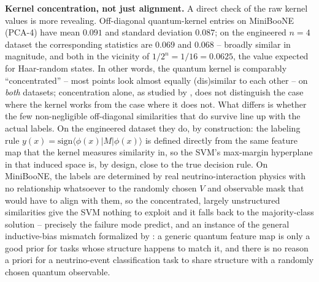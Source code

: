 \documentclass{article}
\begin{document}
\textbf{Kernel concentration, not just alignment.} A direct check of the raw
kernel values is more revealing. Off-diagonal quantum-kernel entries on
MiniBooNE (PCA-4) have mean $0.091$ and standard deviation $0.087$; on the
engineered $n{=}4$ dataset the corresponding statistics are $0.069$ and
$0.068$ -- broadly similar in magnitude, and both in the vicinity of
$1/2^n = 1/16 = 0.0625$, the value expected for Haar-random states. In other
words, the quantum kernel is comparably ``concentrated'' -- most points look
almost equally (dis)similar to each other -- on \emph{both} datasets;
concentration alone, as studied by \citet{thanasilp2024exponential}, does
not distinguish the case where the kernel works from the case where it does
not. What differs is whether the few non-negligible off-diagonal
similarities that do survive line up with the actual labels. On the
engineered dataset they do, by construction: the labeling rule $y(x) =
\mathrm{sign}\langle\phi(x)|M|\phi(x)\rangle$ is defined directly from the
same feature map that the kernel measures similarity in, so the SVM's
max-margin hyperplane in that induced space is, by design, close to the
true decision rule. On MiniBooNE, the labels are determined by real
neutrino-interaction physics with no relationship whatsoever to the
randomly chosen $V$ and observable mask that would have to align with them,
so the concentrated, largely unstructured similarities give the SVM nothing
to exploit and it falls back to the majority-class solution -- precisely
the failure mode \citet{thanasilp2024exponential} predict, and an instance
of the general inductive-bias mismatch formalized by
\citet{kubler2021inductive}: a generic quantum feature map is only a good
prior for tasks whose structure happens to match it, and there is no reason
a priori for a neutrino-event classification task to share structure with a
randomly chosen quantum observable.
\end{document}
